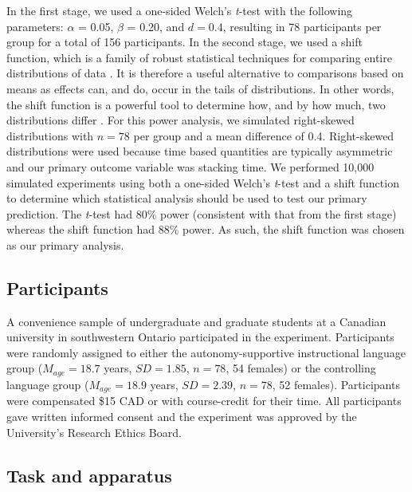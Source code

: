 \documentclass[man,floatsintext,donotrepeattitle,letterpaper,12pt]{apa7}
\begin{document}
In the first stage, we used a one-sided Welch's \emph{t}-test with the following parameters: $\alpha$ = 0.05, $\beta$ = 0.20, and $d = 0.4$, resulting in 78 participants per group for a total of 156 participants. In the second stage, we used a shift function, which is a family of robust statistical techniques for comparing entire distributions of data \autocite{R-rogme,rousselet2020,wilcox2021,wilcox2023}. It is therefore a useful alternative to comparisons based on means as effects can, and do, occur in the tails of distributions. In other words, the shift function is a powerful tool to determine how, and by how much, two distributions differ \autocite{R-rogme,wilcox2021}. For this power analysis, we simulated right-skewed distributions with $n = 78$ per group and a mean difference of 0.4. Right-skewed distributions were used because time based quantities are typically asymmetric \autocite[see][for a discussion]{rousselet2020} and our primary outcome variable was stacking time. We performed 10,000 simulated experiments using both a one-sided Welch's \emph{t}-test and a shift function to determine which statistical analysis should be used to test our primary prediction. The \emph{t}-test had 80\% power (consistent with that from the first stage) whereas the shift function had 88\% power. As such, the shift function was chosen as our primary analysis.\footnotemark{}

\subsection{Participants}

A convenience sample of undergraduate and graduate students at a Canadian university in southwestern Ontario participated in the experiment. Participants were randomly assigned to either the autonomy-supportive instructional language group ($M_{age} = 18.7$ years, $SD = 1.85$, $n = 78$, 54 females) or the controlling language group ($M_{age} = 18.9$ years, $SD = 2.39$, $n = 78$, 52 females). Participants were compensated \$15 CAD or with course-credit for their time. All participants gave written informed consent and the experiment was approved by the University's Research Ethics Board.

\subsection{Task and apparatus}
\end{document}
